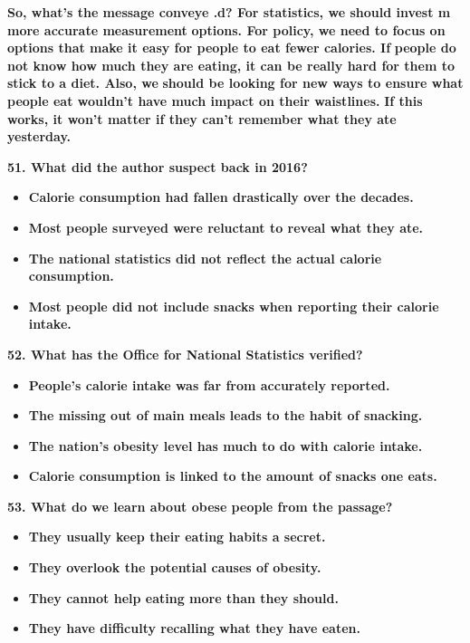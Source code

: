 \documentclass[UTF8,11pt]{ctexart}
\begin{document}
\textbf{So, what's the message conveye .d? For statistics, we should invest m more accurate measurement} \textbf{options. For policy, we need to focus on options that make it easy for people to eat fewer calories. If} \textbf{people do not know how much they are eating, it can be really hard for them to stick to a diet. Also, we} \textbf{should be looking for new ways to ensure what people eat wouldn't have much impact on their waistlines.} \textbf{If this works, it won't matter if they can't remember what they ate yesterday.}


\textbf{51. What did the author suspect back in 2016?}


\begin{itemize}[leftmargin=2em,itemsep=.2em,topsep=.4em]\item[A.] \textbf{Calorie consumption had fallen drastically over the decades.}
\item[B.] \textbf{Most people surveyed were reluctant to reveal what they ate.}
\item[C.] \textbf{The national statistics did not reflect the actual calorie consumption.}
\item[D.] \textbf{Most people did not include snacks when reporting their calorie intake.}
\end{itemize}

\textbf{52. What has the Office for National Statistics verified?}


\begin{itemize}[leftmargin=2em,itemsep=.2em,topsep=.4em]\item[A.] \textbf{People's calorie intake was far from accurately reported.}
\item[B.] \textbf{The missing out of main meals leads to the habit of snacking.}
\item[C.] \textbf{The nation's obesity level has much to do with calorie intake.}
\item[D.] \textbf{Calorie consumption is linked to the amount of snacks one eats.}
\end{itemize}

\textbf{53. What do we learn about obese people from the passage?}


\begin{itemize}[leftmargin=2em,itemsep=.2em,topsep=.4em]\item[A.] \textbf{They usually keep their eating habits a secret.}
\item[B.] \textbf{They overlook the potential causes of obesity.}
\item[C.] \textbf{They cannot help eating more than they should.}
\item[D.] \textbf{They have difficulty recalling what they have eaten.}
\end{itemize}
\end{document}
